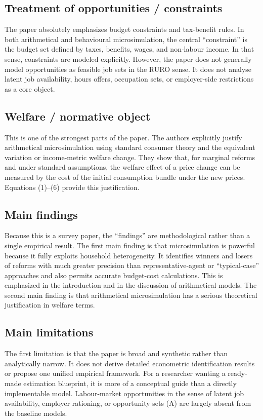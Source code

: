 \documentclass[11pt,a4paper]{article}
\begin{document}
\subsection*{Treatment of opportunities / constraints}
The paper absolutely emphasizes budget constraints and tax-benefit rules. In both arithmetical and behavioural microsimulation, the central “constraint” is the budget set defined by taxes, benefits, wages, and non-labour income. In that sense, constraints are modeled explicitly. However, the paper does not generally model opportunities as feasible job sets in the RURO sense. It does not analyse latent job availability, hours offers, occupation sets, or employer-side restrictions as a core object.

\subsection*{Welfare / normative object}
This is one of the strongest parts of the paper. The authors explicitly justify arithmetical microsimulation using standard consumer theory and the equivalent variation or income-metric welfare change. They show that, for marginal reforms and under standard assumptions, the welfare effect of a price change can be measured by the cost of the initial consumption bundle under the new prices. Equations (1)–(6) provide this justification.

\subsection*{Main findings}
Because this is a survey paper, the “findings” are methodological rather than a single empirical result. The first main finding is that microsimulation is powerful because it fully exploits household heterogeneity. It identifies winners and losers of reforms with much greater precision than representative-agent or “typical-case” approaches and also permits accurate budget-cost calculations. This is emphasized in the introduction and in the discussion of arithmetical models. The second main finding is that arithmetical microsimulation has a serious theoretical justification in welfare terms.

\subsection*{Main limitations}
The first limitation is that the paper is broad and synthetic rather than analytically narrow. It does not derive detailed econometric identification results or propose one unified empirical framework. For a researcher wanting a ready-made estimation blueprint, it is more of a conceptual guide than a directly implementable model. Labour-market opportunities in the sense of latent job availability, employer rationing, or opportunity sets (A) are largely absent from the baseline models.
\end{document}
